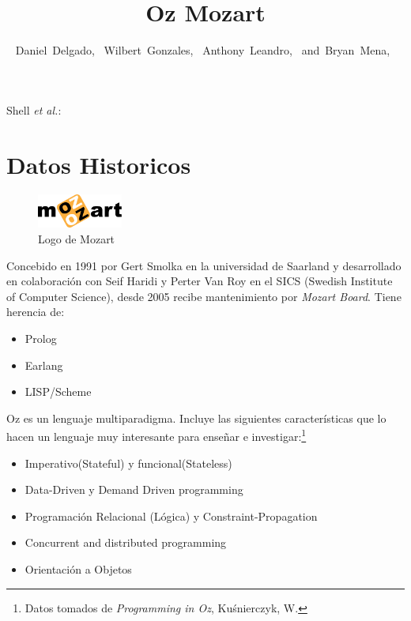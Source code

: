 \documentclass[10pt,journal,compsoc]{IEEEtran}
\begin{document}
\title{Oz Mozart}
\author{Daniel~Delgado,~
        Wilbert~Gonzales,~
        Anthony~Leandro,~
        and~Bryan~Mena,~
}
{Shell \MakeLowercase{\textit{et al.}}: \LaTex}
\maketitle
\IEEEdisplaynontitleabstractindextext
\IEEEpeerreviewmaketitle

\section{Datos Historicos}
\begin{figure}
	\includegraphics[width=0.25\textwidth]{logo.png}
	\caption{\label{fig:Logo}Logo de Mozart}
\end{figure}

\par Concebido en 1991 por Gert Smolka en la universidad de Saarland y desarrollado en colaboraci\'on con Seif Haridi y Perter Van Roy en el SICS (Swedish Institute of Computer Science), desde 2005 recibe mantenimiento por \emph{Mozart Board}. Tiene herencia de:
\begin{itemize}
	\item Prolog
	\item Earlang
	\item LISP/Scheme
\end{itemize}
Oz es un lenguaje multiparadigma. Incluye las siguientes caracter\'isticas que lo hacen un lenguaje muy interesante para ense\~nar e investigar:\footnote{Datos tomados de \emph{Programming in Oz}, Ku\'snierczyk, W.}
\begin{itemize}
	\item Imperativo(Stateful) y funcional(Stateless)
	\item Data-Driven y Demand Driven programming
	\item Programaci\'on Relacional (L\'ogica) y Constraint-Propagation
	\item Concurrent and distributed programming
	\item Orientaci\'on a Objetos
\end{itemize}
\end{document}

